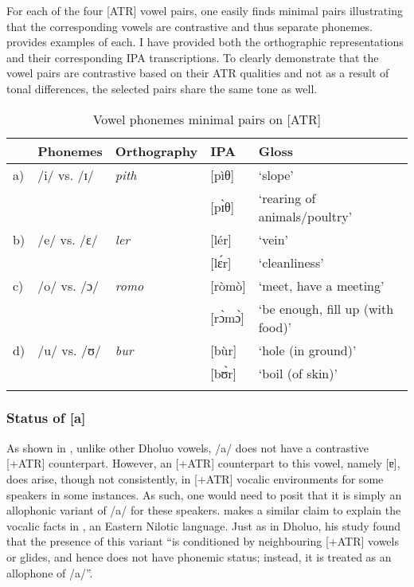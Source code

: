 \documentclass[output=paper,colorlinks,citecolor=brown]{langscibook}
\begin{document}
For each of the four [ATR]  vowel pairs, one easily finds minimal pairs illustrating that the corresponding vowels are contrastive and thus separate phonemes.  provides examples of each. I have provided both the orthographic representations and their corresponding IPA transcriptions. To clearly demonstrate that the vowel pairs are contrastive based on their ATR qualities and not as a result of tonal differences, the selected pairs share the same tone as well.

\begin{table}
\caption{Vowel phonemes minimal pairs on [ATR]}
\label{tab:ATRComparison}
 \begin{tabular}{lllll}
  \lsptoprule
& Phonemes & Orthography & IPA & Gloss \\
\midrule
a) & /i/ vs. /ɪ/ & \textit{pith} & [pìθ] & `slope' \\
&&& [pɪ̀θ] & `rearing of animals/poultry' \\
b) & /e/ vs. /ɛ/ & \textit{ler} & [lér] & `vein' \\
&&& [lɛ́r] & `cleanliness' \\
c) & /o/ vs. /ɔ/ & \textit{romo} & [ròmò] & `meet, have a meeting'\\
&&& [rɔ̀mɔ̀] & `be enough, fill up (with food)' \\
d) & /u/ vs. /ʊ/ & \textit{bur} & [bùr] & `hole (in ground)' \\
&&& [bʊ̀r] & `boil (of skin)' \\
  \lspbottomrule
 \end{tabular}
\end{table}   

\subsubsection{Status of [a]}

As shown in , unlike other Dholuo vowels, /a/ does not have a contrastive [+ATR] counterpart. However, an [+ATR] counterpart to this vowel, namely [ɐ], does arise, though not consistently, in [+ATR] vocalic environments for some speakers in some instances. As such, one would need to posit that it is simply an allophonic variant of /a/ for these speakers. \citet[61]{Barasa2018} makes a similar claim to explain the vocalic facts in , an Eastern Nilotic language. Just as in Dholuo, his study found that the presence of this variant “is conditioned by neighbouring [+ATR] vowels or glides, and hence does not have phonemic status; instead, it is treated as an allophone of /a/”.
\end{document}
